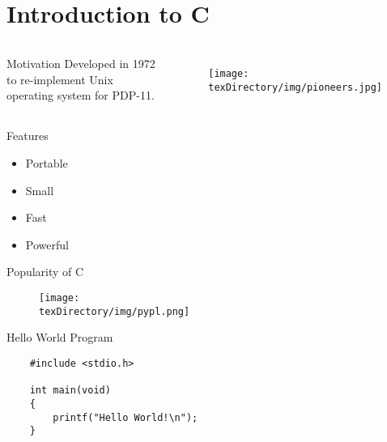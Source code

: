 \documentclass[compress]{beamer}
\begin{document}
\prepareCover

\section{Introduction to C}

\begin{slide}
	\begin{columns}
	\begin{block}{Motivation}
	Developed in 1972 to re-implement Unix operating system for PDP-11.
	\end{block}
	\begin{figure}
	\texttt{[image: \\texDirectory/img/pioneers.jpg]}
	\end{figure}
	\end{columns}
\end{slide}

\begin{slide}
	\begin{block}{Features}

	\begin{itemize}
	\item[] Portable
	\item[] Small
	\item[] Fast
	\item[] Powerful
	\end{itemize}

	\end{block}
\end{slide}

\begin{slide}
	\begin{block}{Popularity of C}

	\begin{figure}
	\texttt{[image: \\texDirectory/img/pypl.png]}
	\end{figure}

	\end{block}
\end{slide}

\begin{slide}
	\begin{block}{Hello World Program}

	\begin{verbatim}
	#include <stdio.h>
	
	int main(void)
	{
	    printf("Hello World!\n");
	}
	\end{verbatim}

	\end{block}
\end{slide}
\end{document}
